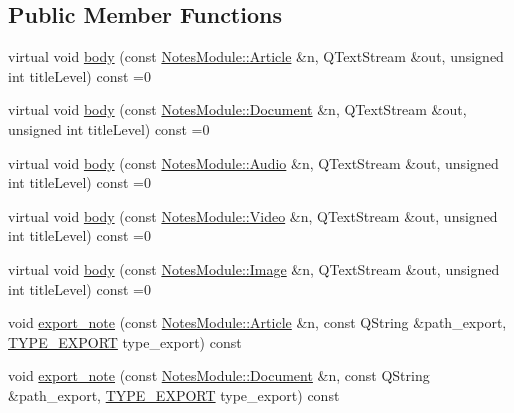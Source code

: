 \subsection*{Public Member Functions}
\begin{DoxyCompactItemize}
\item 
virtual void \hyperlink{classexport__notes_1_1_father_of_exporters_a3368bb36a48fc246c6eb0b2a4d4bb6fc}{body} (const \hyperlink{class_notes_module_1_1_article}{Notes\-Module\-::\-Article} \&n, Q\-Text\-Stream \&out, unsigned int title\-Level) const =0
\item 
virtual void \hyperlink{classexport__notes_1_1_father_of_exporters_a9be8f891a7d819534f14241950498f2f}{body} (const \hyperlink{class_notes_module_1_1_document}{Notes\-Module\-::\-Document} \&n, Q\-Text\-Stream \&out, unsigned int title\-Level) const =0
\item 
virtual void \hyperlink{classexport__notes_1_1_father_of_exporters_a0370003c9de695c22d31aa34e1309736}{body} (const \hyperlink{class_notes_module_1_1_audio}{Notes\-Module\-::\-Audio} \&n, Q\-Text\-Stream \&out, unsigned int title\-Level) const =0
\item 
virtual void \hyperlink{classexport__notes_1_1_father_of_exporters_a17520fe618ce8c7c4c3f5951c5e20a91}{body} (const \hyperlink{class_notes_module_1_1_video}{Notes\-Module\-::\-Video} \&n, Q\-Text\-Stream \&out, unsigned int title\-Level) const =0
\item 
virtual void \hyperlink{classexport__notes_1_1_father_of_exporters_a8fd565374195e2831f5375ed3a4aed9e}{body} (const \hyperlink{class_notes_module_1_1_image}{Notes\-Module\-::\-Image} \&n, Q\-Text\-Stream \&out, unsigned int title\-Level) const =0
\item 
void \hyperlink{classexport__notes_1_1_father_of_exporters_adc94f8694a4c08213eca48d6da312cdf}{export\-\_\-note} (const \hyperlink{class_notes_module_1_1_article}{Notes\-Module\-::\-Article} \&n, const Q\-String \&path\-\_\-export, \hyperlink{_t_y_p_e_s___e_x_p_o_r_t_8h_a25a17d8584d83ab977791df2476e006c}{T\-Y\-P\-E\-\_\-\-E\-X\-P\-O\-R\-T} type\-\_\-export) const 
\item 
void \hyperlink{classexport__notes_1_1_father_of_exporters_a0b96e7950cdbb9908676dffefea4b795}{export\-\_\-note} (const \hyperlink{class_notes_module_1_1_document}{Notes\-Module\-::\-Document} \&n, const Q\-String \&path\-\_\-export, \hyperlink{_t_y_p_e_s___e_x_p_o_r_t_8h_a25a17d8584d83ab977791df2476e006c}{T\-Y\-P\-E\-\_\-\-E\-X\-P\-O\-R\-T} type\-\_\-export) const 
\item 

\end{DoxyCompactItemize}
